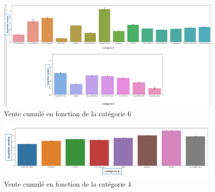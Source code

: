 \documentclass{article} %
\begin{document}
\begin{figure}[!h]
	\centering 
	\includegraphics[keepaspectratio = true,scale=0.55]{categorie6.png}
	\caption{Vente cumulé en fonction de la catégorie 6}
	\label{bb3}
\end{figure}
\newpage
\begin{figure}[!h]
	\centering
	\includegraphics[keepaspectratio = true,scale=0.55]{categorie4.png}
	\caption{Vente cumulé en fonction de la catégorie 4}
	\label{bb3}
\end{figure}
\end{document}
